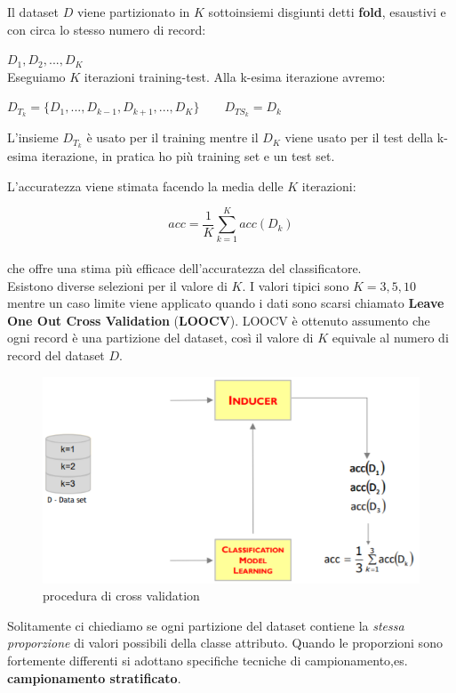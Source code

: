 Il dataset $D$ viene partizionato in $K$ sottoinsiemi disgiunti detti \textbf{fold}, esaustivi e con circa lo stesso numero di record: 

$D_1, D_2, ..., D_K$\\

Eseguiamo $K$ iterazioni training-test. Alla k-esima iterazione avremo:

$D_{T_k} = \{D_1, ...,D_{k-1},D_{k+1}, ...,D_K\} \qquad D_{TS_k} = D_k$

L'insieme $D_{T_k}$ è usato per il training  mentre il $D_K$ viene usato per il test della k-esima iterazione, in pratica ho più training set e un test set.

L'accuratezza viene stimata facendo la media delle $K$ iterazioni:

\[acc = \frac{1}{K} \sum_{k=1}^K acc(D_k)\]\\

che offre una stima più efficace dell'accuratezza del classificatore. \\

Esistono diverse selezioni per il valore di $K$. I valori tipici sono $K = 3,5,10$ mentre un caso limite viene applicato quando i dati sono scarsi chiamato \textbf{Leave One Out Cross Validation} (\textbf{LOOCV}). LOOCV è ottenuto assumento che ogni record è una partizione del dataset, così il valore di $K$ equivale al numero di record del dataset $D$.

\begin{figure}[H]
	\centering
	\includegraphics[height=0.4 \linewidth]{classification/pict/cross_validation.png}
	\caption{procedura di cross validation}
\end{figure}

Solitamente ci chiediamo se ogni partizione del dataset contiene la \textit{stessa proporzione} di valori possibili della classe attributo. Quando le proporzioni sono fortemente differenti si adottano specifiche tecniche di campionamento,es. \textbf{campionamento stratificato}. 

